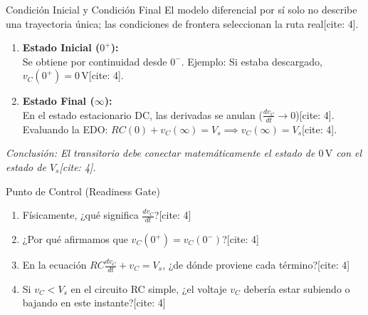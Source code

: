 \documentclass[aspectratio=169, 10pt]{beamer}
\begin{document}
\begin{frame}{Condición Inicial y Condición Final}
    El modelo diferencial por sí solo no describe una trayectoria única; las condiciones de frontera seleccionan la ruta real[cite: 4].
    
    \vspace{0.3cm}
    \begin{enumerate}
        \item \textbf{Estado Inicial ($0^+$):}\\
        Se obtiene por continuidad desde $0^-$. Ejemplo: Si estaba descargado, $v_C(0^+) = 0\,\text{V}$[cite: 4].
        
        \item \textbf{Estado Final ($\infty$):}\\
        En el estado estacionario DC, las derivadas se anulan ($\frac{dv_C}{dt} \to 0$)[cite: 4].\\
        Evaluando la EDO: $RC (0) + v_C(\infty) = V_s \implies v_C(\infty) = V_s$[cite: 4].
    \end{enumerate}
    
    \vspace{0.3cm}
    \textit{Conclusión: El transitorio debe conectar matemáticamente el estado de $0\,\text{V}$ con el estado de $V_s$[cite: 4].}
\end{frame}

\begin{frame}{Punto de Control (Readiness Gate)}
    \begin{tcolorbox}[colback=white, colframe=black, title=\textbf{Verificación Formativa}]
        \begin{enumerate}
            \item Físicamente, ¿qué significa $\frac{dv_C}{dt}$?[cite: 4]
            \item ¿Por qué afirmamos que $v_C(0^+) = v_C(0^-)$?[cite: 4]
            \item En la ecuación $RC \frac{dv_C}{dt} + v_C = V_s$, ¿de dónde proviene cada término?[cite: 4]
            \item Si $v_C < V_s$ en el circuito RC simple, ¿el voltaje $v_C$ debería estar subiendo o bajando en este instante?[cite: 4]
        \end{enumerate}
    \end{tcolorbox}
\end{frame}
\end{document}
